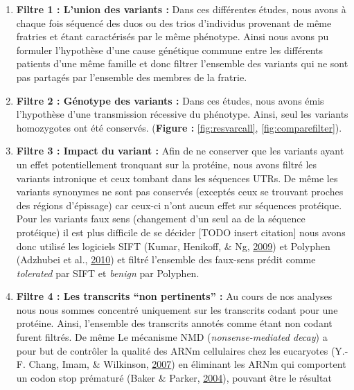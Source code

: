 \documentclass[12pt,twoside]{reedthesis}
\providecommand{\tightlist}{%
  \setlength{\itemsep}{0pt}\setlength{\parskip}{0pt}}
\theoremstyle{definition}
\theoremstyle{definition}
\theoremstyle{remark}
\begin{document}
  \begin{enumerate}
  \def\labelenumi{\arabic{enumi}.}
  \tightlist
  \item
    \textbf{Filtre 1 : L'union des variants :} Dans ces différentes
    études, nous avons à chaque fois séquencé des duos ou des trios
    d'individus provenant de même fratries et étant caractérisés par le
    même phénotype. Ainsi nous avons pu formuler l'hypothèse d'une cause
    génétique commune entre les différents patients d'une même famille et
    donc filtrer l'ensemble des variants qui ne sont pas partagés par
    l'ensemble des membres de la fratrie.\\
  \item
    \textbf{Filtre 2 : Génotype des variants :} Dans ces études, nous
    avons émis l'hypothèse d'une transmission récessive du phénotype.
    Ainsi, seul les variants homozygotes ont été conservés.
    (\textbf{Figure : }\ref{fig:resvarcall}, \ref{fig:comparefilter}).\\
  \item
    \textbf{Filtre 3 : Impact du variant :} Afin de ne conserver que les
    variants ayant un effet potentiellement tronquant sur la protéine,
    nous avons filtré les variants intronique et ceux tombant dans les
    séquences UTRs. De même les variants synonymes ne sont pas conservés
    (exceptés ceux se trouvant proches des régions d'épissage) car ceux-ci
    n'ont aucun effet sur séquences protéique. Pour les variants faux sens
    (changement d'un seul aa de la séquence protéique) il est plus
    difficile de se décider {[}TODO insert citation{]} nous avons donc
    utilisé les logiciels SIFT (Kumar, Henikoff, \& Ng,
    \protect\hyperlink{ref-Kumar2009}{2009}) et Polyphen (Adzhubei et al.,
    \protect\hyperlink{ref-Adzhubei2010}{2010}) et filtré l'ensemble des
    faux-sens prédit comme \emph{tolerated} par SIFT et \emph{benign} par
    Polyphen.\\
  \item
    \textbf{Filtre 4 : Les transcrits ``non pertinents'' :} Au cours de
    nos analyses nous nous sommes concentré uniquement sur les transcrits
    codant pour une protéine. Ainsi, l'ensemble des transcrits annotés
    comme étant non codant furent filtrés. De même Le mécanisme NMD
    (\emph{nonsense-mediated decay}) a pour but de contrôler la qualité
    des ARNm cellulaires chez les eucaryotes (Y.-F. Chang, Imam, \&
    Wilkinson, \protect\hyperlink{ref-Chang2007}{2007}) en éliminant les
    ARNm qui comportent un codon stop prématuré (Baker \& Parker,
    \protect\hyperlink{ref-Baker2004}{2004}), pouvant être le résultat

\end{enumerate}
\end{document}

